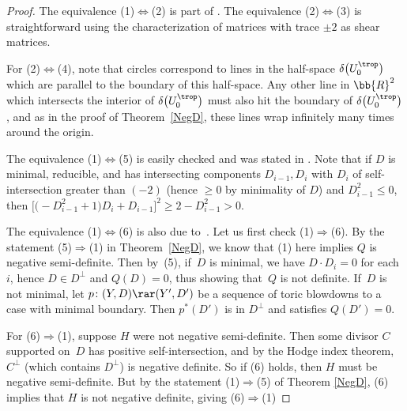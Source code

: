 \begin{proof}
The equivalence (1)$\Leftrightarrow$(2) is part of \cite[Lemma 1.5, arXiv v1]{GHK1}. The equivalence (2)$\Leftrightarrow$(3) is straightforward using the characterization of matrices with trace $\pm 2$ as shear matrices.

For (2)$\Leftrightarrow$(4), note that circles correspond to lines in the half-space $\delta\big(U_0^{\trop}\big)$ which are parallel to the boundary of this half-space. Any other line in $\bb{R}^2$ which intersects the interior of $\delta\big(U_0^{\trop}\big)$ must also hit the boundary of $\delta\big(U_0^{\trop}\big)$, and as in the proof of Theorem~\ref{NegD}, these lines wrap infinitely many times around the origin.

The equivalence (1)$\Leftrightarrow$(5) is easily checked and was stated in \cite[Section~0.5.2, arXiv v1]{GHK1}. Note that if $D$ is minimal, reducible, and has intersecting components $D_{i-1}, D_i$ with $D_i$ of self-inter\-section greater than $(-2)$ (hence $\geq 0$ by minimality of $D$) and $D_{i-1}^2\leq 0$, then $\big[\big({-}D_{i-1}^2+1\big)D_i+D_{i-1}\big]^2\geq 2-D_{i-1}^2 > 0$.

The equivalence (1)$\Leftrightarrow$(6) is also due to~\cite{GHK2}. Let us first check (1)$\Rightarrow$(6). By the statement (5)$\Rightarrow$(1) in Theorem~\ref{NegD}, we know that (1) here implies $Q$ is negative semi-definite. Then by~(5), if~$D$ is minimal, we have $D\cdot D_i=0$ for each $i$, hence $D\in D^{\perp}$ and $Q(D)=0$, thus showing that~$Q$ is not definite. If~$D$ is not minimal, let $p\colon (Y,D)\rar (Y',D')$ be a sequence of toric blowdowns to a case with minimal boundary. Then $p^*(D')$ is in $D^{\perp}$ and satisfies $Q(D')=0$.

For (6)$\Rightarrow$(1), suppose $H$ were not negative semi-definite. Then some divisor $C$ supported on~$D$ has positive self-intersection, and by the Hodge index theorem, $C^{\perp}$ (which contains $D^{\perp}$) is negative definite. So if (6) holds, then $H$ must be negative semi-definite. But by the statement (1)$\Rightarrow$(5) of Theorem \ref{NegD}, (6) implies that $H$ is not negative definite, giving (6)$\Rightarrow$(1)


\end{proof}
